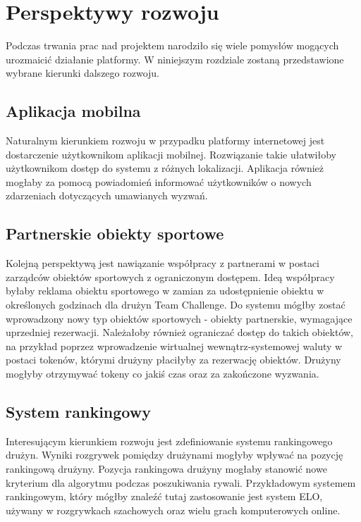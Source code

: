 \chapter{Perspektywy rozwoju}

Podczas trwania prac nad projektem narodziło się wiele pomysłów mogących urozmaicić działanie platformy. W niniejszym rozdziale zostaną przedstawione wybrane kierunki dalszego rozwoju.

\section{Aplikacja mobilna}

Naturalnym kierunkiem rozwoju w przypadku platformy internetowej jest dostarczenie użytkownikom aplikacji mobilnej. Rozwiązanie takie ułatwiłoby użytkownikom dostęp do systemu z różnych lokalizacji. Aplikacja również mogłaby za pomocą powiadomień informować użytkowników o nowych zdarzeniach dotyczących umawianych wyzwań.

\section{Partnerskie obiekty sportowe}

Kolejną perspektywą jest nawiązanie współpracy z partnerami w postaci zarządców obiektów sportowych z ograniczonym dostępem. Ideą współpracy byłaby reklama obiektu sportowego w zamian za udostępnienie obiektu w określonych godzinach dla drużyn Team Challenge. Do systemu mógłby zostać wprowadzony nowy typ obiektów sportowych - obiekty partnerskie, wymagające uprzedniej rezerwacji. Należałoby również ograniczać dostęp do takich obiektów, na przykład poprzez wprowadzenie wirtualnej wewnątrz-systemowej waluty w postaci tokenów, którymi drużyny płaciłyby za rezerwację obiektów. Drużyny mogłyby otrzymywać tokeny co jakiś czas oraz za zakończone wyzwania.

\section{System rankingowy}

Interesującym kierunkiem rozwoju jest zdefiniowanie systemu rankingowego drużyn. Wyniki rozgrywek pomiędzy drużynami mogłyby wpływać na pozycję rankingową drużyny. Pozycja rankingowa drużyny mogłaby stanowić nowe kryterium dla algorytmu podczas poszukiwania rywali. Przykładowym systemem rankingowym, który mógłby znaleźć tutaj zastosowanie jest system ELO, używany w rozgrywkach szachowych oraz wielu grach komputerowych online.

\begin{comment}

proponowanei spotkan przez zawodnikow
propozycje pobliskich obiektow przy negocjacjach miejsca
system notyfikacji

\end{comment}